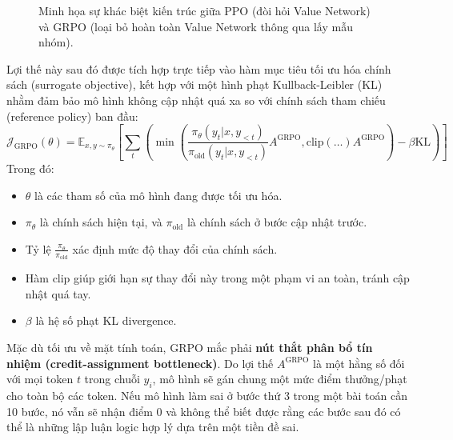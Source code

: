 \documentclass[12pt,a4paper]{report}
\begin{document}
\begin{figure}[h!]
{
    }
    \caption{Minh họa sự khác biệt kiến trúc giữa PPO (đòi hỏi Value Network) và GRPO (loại bỏ hoàn toàn Value Network thông qua lấy mẫu nhóm).}
    \label{fig:ppo_vs_grpo}
\end{figure}

Lợi thế này sau đó được tích hợp trực tiếp vào hàm mục tiêu tối ưu hóa chính sách (surrogate objective), kết hợp với một hình phạt Kullback-Leibler (KL) nhằm đảm bảo mô hình không cập nhật quá xa so với chính sách tham chiếu (reference policy) ban đầu:
\begin{equation}
    \mathcal{J}_{\text{GRPO}}(\theta) = \mathbb{E}_{x, y \sim \pi_\theta} \left[ \sum_{t} \left( \min \left( \frac{\pi_\theta(y_t|x, y_{<t})}{\pi_{\text{old}}(y_t|x, y_{<t})} A^{\text{GRPO}}, \text{clip}\left(\dots\right)A^{\text{GRPO}} \right) - \beta \text{KL} \right) \right]
\end{equation}
Trong đó:
\begin{itemize}
    \item $\theta$ là các tham số của mô hình đang được tối ưu hóa.
    \item $\pi_\theta$ là chính sách hiện tại, và $\pi_{\text{old}}$ là chính sách ở bước cập nhật trước.
    \item Tỷ lệ $\frac{\pi_\theta}{\pi_{\text{old}}}$ xác định mức độ thay đổi của chính sách.
    \item Hàm $\text{clip}$ giúp giới hạn sự thay đổi này trong một phạm vi an toàn, tránh cập nhật quá tay.
    \item $\beta$ là hệ số phạt KL divergence.
\end{itemize}

Mặc dù tối ưu về mặt tính toán, GRPO mắc phải \textbf{nút thắt phân bổ tín nhiệm (credit-assignment bottleneck)}. Do lợi thế $A^{\text{GRPO}}$ là một hằng số đối với mọi token $t$ trong chuỗi $y_i$, mô hình sẽ gán chung một mức điểm thưởng/phạt cho toàn bộ các token. Nếu mô hình làm sai ở bước thứ 3 trong một bài toán cần 10 bước, nó vẫn sẽ nhận điểm 0 và không thể biết được rằng các bước sau đó có thể là những lập luận logic hợp lý dựa trên một tiền đề sai.
\end{document}
